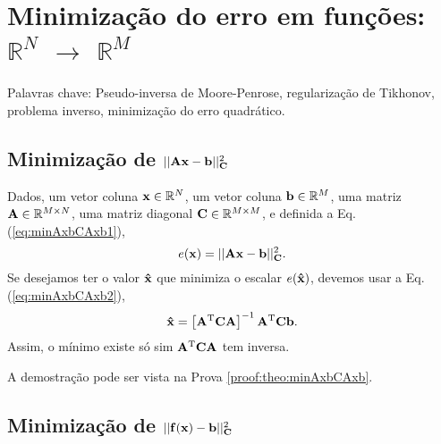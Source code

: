 
\chapter{Minimização do erro em funções: $\mathbb{R}^{N}$ $\rightarrow$ $\mathbb{R}^{M}$}

\begin{remark}
Palavras chave: 
Pseudo-inversa de Moore-Penrose,
regularização de Tikhonov,
problema inverso, 
minimização do erro quadrático. 
\end{remark}
\section{Minimização de $||\MATRIX{A}\VECTOR{x}-\VECTOR{b}||_{\MATRIX{C}}^2$
}

\begin{theorem}\label{theo:minAxbCAxb}
Dados,
um vetor coluna $\VECTOR{x}\in \mathbb{R}^N$, 
um vetor coluna $\VECTOR{b}\in \mathbb{R}^M$,  
uma matriz $\MATRIX{A} \in \mathbb{R}^{M\times N}$, 
uma matriz diagonal $\MATRIX{C} \in \mathbb{R}^{M\times M}$, e 
definida a Eq. (\ref{eq:minAxbCAxb1}),
\begin{equation}\label{eq:minAxbCAxb1}
e(\VECTOR{x})=||\MATRIX{A}\VECTOR{x}-\VECTOR{b}||_{\MATRIX{C}}^2.
\end{equation}
Se desejamos ter o valor $\VECTOR{\hat{x}}$ que minimiza o escalar $e(\VECTOR{\hat{x}})$,
devemos usar a Eq. (\ref{eq:minAxbCAxb2}),
\begin{equation}\label{eq:minAxbCAxb2}
\VECTOR{\hat{x}} =
\left[ \MATRIX{A}^{\transpose}\MATRIX{C} \MATRIX{A} \right]^{-1}\MATRIX{A}^{\transpose}\MATRIX{C}\VECTOR{b}.
\end{equation}
Assim, o mínimo existe só sim $\MATRIX{A}^{\transpose}\MATRIX{C} \MATRIX{A}$ tem inversa.

A demostração pode ser vista na Prova \ref{proof:theo:minAxbCAxb}.
\end{theorem}



\section{Minimização de $||\VECTOR{f}(\VECTOR{x})-\VECTOR{b}||_{\MATRIX{C}}^2$
}

